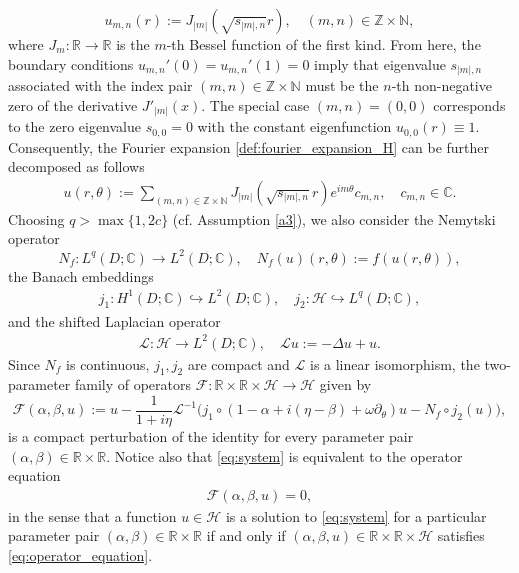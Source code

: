 \documentclass[11pt]{amsart}
\def\bc{{\mathbb{C}}}
\def\bn{{\mathbb{N}}}
\def\br{{\mathbb{R}}}
\def\bz{{\mathbb{Z}}}
\def\br{\mathbb R}
\begin{document}
\[
u_{m,n}(r) := J_{|m|}\left( \sqrt{s_{|m|,n}} r \right), \quad (m,n) \in \bz \times \bn,
\]
where $J_{m}: \br \rightarrow \br$ is the $m$-th Bessel function of the first kind. 
From here, the boundary conditions $u_{m,n}'(0) = u_{m,n}'(1) = 0$
imply that eigenvalue $s_{|m|,n}$ associated with the index pair $(m,n) \in \bz \times \bn$ must be the $n$-th non-negative zero of the derivative $J'_{|m|}(x)$. The special case $(m,n)=(0,0)$ corresponds to the zero eigenvalue $s_{0,0} = 0$ with the constant eigenfunction $u_{0,0}(r)\equiv1$. Consequently, the Fourier expansion \eqref{def:fourier_expansion_H} can be further decomposed as follows
\begin{align}\label{def:full_fourier_expansion_H}
u(r,\theta) := \sum_{(m,n) \in \bz  \times \bn} J_{|m|}\left(\sqrt{s_{|m|,n}}r\right) 
e^{im \theta}c_{m,n}, \quad c_{m,n} \in \bc.
\end{align}
Choosing $q > \max\{1,2 c\}$ (cf. Assumption \ref{a3}), we also consider the Nemytski operator
\[
N_f: L^q(D;\bc) \rightarrow L^2(D;\bc), \quad N_f(u)(r, \theta ) := f(u(r, \theta )),
\]
the Banach embeddings
\begin{align*}
j_1: H^1(D;\bc) \hookrightarrow L^2(D;\bc), \quad j_2: \mathscr H \hookrightarrow L^q(D;\bc),
\end{align*}
and the shifted Laplacian operator
\begin{align*}
    \mathscr L : \mathscr H \rightarrow L^2(D; \bc), \quad \mathscr L u := -\Delta u + u.
\end{align*}
Since $N_f$ is continuous, $j_1,j_2$ are compact and $\mathscr L$ is a linear isomorphism, the two-parameter family of operators $\mathscr F: \br \times \br \times \mathscr H \rightarrow \mathscr H$ given by
\[
\mathscr F(\alpha,\beta,u):= u -  \frac{1}{1+i\eta} \mathscr L^{-1}\big( j_1 \circ (1-\alpha + i(\eta- \beta) + \omega \partial_\theta)u -N_f \circ j_2(u) \big),
\]
is a compact perturbation of the identity for every parameter pair $(\alpha,\beta) \in \br \times \br$. Notice also that \eqref{eq:system} is equivalent to the operator equation
\begin{align}\label{eq:operator_equation}
    \mathscr F(\alpha,\beta,u) = 0,
\end{align}
in the sense that a function $u \in \mathscr H$ is a solution to \eqref{eq:system} for a particular parameter pair $(\alpha,\beta) \in \br \times \br$ if and only if $(\alpha,\beta,u) \in \br \times \br \times \mathscr H$ satisfies \eqref{eq:operator_equation}.
\end{document}
